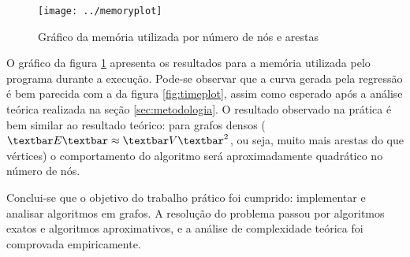 \begin{figure}[h]
\centering
\texttt{[image: ../memoryplot]}
\caption{Gráfico da memória utilizada por número de nós e arestas}
\label{fig:memoryplot}
\end{figure}

O gráfico da figura \ref{fig:memoryplot} apresenta os resultados para a memória utilizada pelo programa durante a execução. Pode-se observar que a curva gerada pela regressão é bem parecida com a da figura \ref{fig:timeplot}, assim como esperado após a análise teórica realizada na seção \ref{sec:metodologia}. O resultado  observado na prática é bem similar ao resultado teórico: para grafos densos ($\textbar E \textbar \approx \textbar V \textbar^2$, ou seja, muito mais arestas do que vértices) o comportamento do algoritmo será aproximadamente quadrático no número de nós.

Conclui-se que o objetivo do trabalho prático foi cumprido: implementar e analisar algoritmos em grafos. A resolução do problema passou por algoritmos exatos e algoritmos aproximativos, e a análise de complexidade teórica foi comprovada empiricamente.